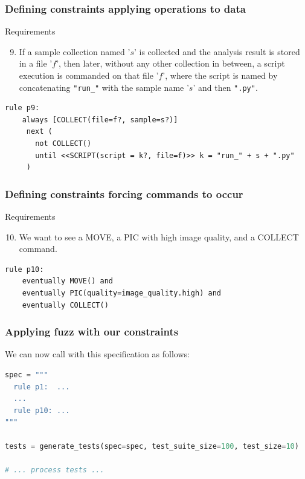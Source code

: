 \begin{frame}[fragile]
  \frametitle{Defining constraints applying operations to data} \small

\begin{block}{Requirements}
\begin{enumerate}
\setcounter{enumi}{8}
\item If a sample collection named '$s$' is collected and the analysis result is stored in a
file '$f$', then later, without any other collection in
between, a script execution is commanded on that file '$f$',
where the script is named by concatenating \verb+"run_"+ with the sample name '$s$' 
and then \verb+".py"+.
\end{enumerate}
\end{block}

\begin{lstlisting}[language=fuzzdsl,frame=single]
  rule p9:     
    always [COLLECT(file=f?, sample=s?)] 
     next (
       not COLLECT()  
       until <<SCRIPT(script = k?, file=f)>> k = "run_" + s + ".py"
     )  
\end{lstlisting}

\end{frame}


\begin{frame}[fragile]
  \frametitle{Defining constraints forcing commands to occur} \small

\begin{block}{Requirements}
\begin{enumerate}
\setcounter{enumi}{9}
\item We want to see a MOVE, a PIC with high image quality, 
and a COLLECT command.
\end{enumerate}
\end{block}

\begin{lstlisting}[language=fuzzdsl,frame=single]
  rule p10: 
    eventually MOVE() and 
    eventually PIC(quality=image_quality.high) and 
    eventually COLLECT()
\end{lstlisting}

\end{frame}


\begin{frame}[fragile]
  \frametitle{Applying fuzz with our constraints} \small

We can now call  with this specification
as follows:

\begin{lstlisting}[language=python,frame=single]
spec = """
  rule p1:  ...
  ...
  rule p10: ...
"""

tests = generate_tests(spec=spec, test_suite_size=100, test_size=10)

# ... process tests ...
\end{lstlisting}

\end{frame}


